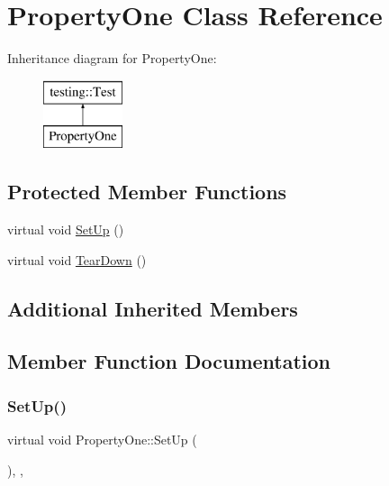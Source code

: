 \hypertarget{classPropertyOne}{}\section{Property\+One Class Reference}
\label{classPropertyOne}
Inheritance diagram for Property\+One\+:\begin{figure}[H]
\begin{center}
\leavevmode
\includegraphics[height=2.000000cm]{classPropertyOne}
\end{center}
\end{figure}
\subsection*{Protected Member Functions}
\begin{DoxyCompactItemize}
\item 
virtual void \mbox{\hyperlink{classPropertyOne_a9cb7d7cb508d5f1a6fc7cfead81ebc2b}{Set\+Up}} ()
\item 
virtual void \mbox{\hyperlink{classPropertyOne_a3ed895113848403d5ea27f52a1bb0545}{Tear\+Down}} ()
\end{DoxyCompactItemize}
\subsection*{Additional Inherited Members}


\subsection{Member Function Documentation}
\mbox{\label{classPropertyOne_a9cb7d7cb508d5f1a6fc7cfead81ebc2b}} 
\subsubsection{\texorpdfstring{SetUp()}{SetUp()}}
{\footnotesize\ttfamily virtual void Property\+One\+::\+Set\+Up (\begin{DoxyParamCaption}{ }\end{DoxyParamCaption})\hspace{0.3cm}{\ttfamily [inline]}, {\ttfamily [protected]}, {\ttfamily [virtual]}}



